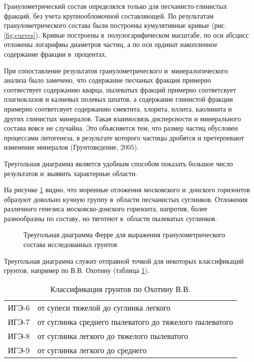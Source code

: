 Гранулометрический состав определялся только для песчанисто-глинистых фракций, без учета крупнообломочной составляющей.
По результатам гранулометрического состава были построены кумулятивные кривые (рис. \ref{fig:curves}).
Кривые построены в~полулогарифическом масштабе, 
по оси абсцисс отложены логарифмы диаметров частиц, 
а по оси ординат накопленное содержание фракции в~процентах.

{
\small

}

При сопоставление результатов гранулометрического и~минералогического анализа было замечено, 
что содержание песчаных фракция примерно соотвествует содержанию кварца, пылеватых фракций примерно соответсвует плагиоклазов и калиевых полевых шпатов, а содержание глинистой фракции примерно соответсвует содержанию смектита, хлорита, иллита, каолинита и других глинистых минералов.
Такая взаимосвязь дисперсности и минерального состава вовсе не случайна. Это объясняется тем, что размер частиц обусловен процессами литогенеза, в результате которого частицы дробятся и претерпевают изменение минералов (Грунтоведение, 2005)\cite{grunt2005}.

Треугольная диаграмма является удобным способом показать большое число результатов и~выявить характерные области.

На рисунке \ref{Fig:Ferre} видно, что моренные отложения московского и~донского горизонтов образуют довольно кучную группу в~области песчанистых суглинков.
Отложения различного генезиса московско-донского горизонта, напротив, более разнообразны по составу, но тяготеют к~области 
пылеватых суглинков.

\begin{figure}[ht]
    \centering
    \small
    
    \caption{Треугольная диаграмма Ферре для выражения гранулометрического состава исследованных грунтов}
    \label{Fig:Ferre}
\end{figure}

Треугольная диаграмма служит отправной точкой для некоторых классификаций грунтов, например по В.\;В. Охотину (таблица \ref{tab:oxot}).

\begin{table}[ht]
    \centering
    \caption{Классификация грунтов по Охотину В.\:В.} \label{tab:oxot}
    \begin{tabular}{cl}
    ИГЭ-6 \dotfill &  от супеси тяжелой до суглинка легкого \\
    ИГЭ-7 \dotfill &  от суглинка среднего пылеватого до тяжелого пылеватого \\
    ИГЭ-8 \dotfill &  от суглинка легкого до тяжелого пылеватого \\
    ИГЭ-9 \dotfill &  от суглинка легкого до среднего \\
    \end{tabular}
\end{table}

